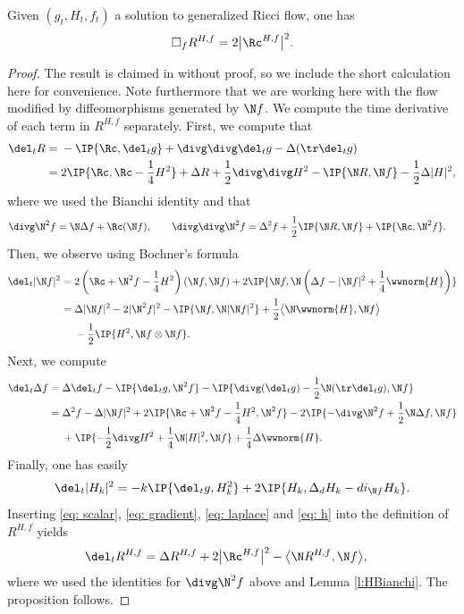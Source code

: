\begin{prop}\label{p:scalarmonotonicity} Given $(g_t, H_t, f_t)$ a solution to generalized Ricci flow, one has
\begin{align*}
\square_f R^{H,f} = 2 \big|\Rc^{H,f}\big|^2.
\end{align*}
\begin{proof} The result is claimed in \cite{Streetsscalar} without proof, so we include the short calculation here for convenience. Note furthermore that we are working here with the flow modified by diffeomorphisms generated by $\N f$. We compute the time derivative of each term in $R^{H,f}$ separately.
First, we compute that
	\begin{align}
 	\del_t R={}&-\IP{\Rc,\del_tg}+\divg\divg\del_t g-\Delta(\tr \del_t g)\nonumber\\
 ={}& 2\IP{\Rc,\Rc-\frac14 H^2}+\Delta R+\frac12\divg\divg H^2-\IP{\N R,\N f}-\frac12\Delta|H|^2, \label{eq: scalar}
 \end{align}
 	where we used the Bianchi identity and that
 	\begin{align*}
 	&\divg \N^2f= \N\Delta f+\Rc(\N f),\qquad\divg\divg \N^2f= \Delta^2 f+\frac12\IP{\N R,\N f}+\IP{\Rc,\N^2 f}.
 	\end{align*}
 	Then, we observe using Bochner's formula
 	\begin{align}
 	\del_t|\N f|^2={}& 2\left(\Rc+\N^2 f-\frac14 H^2\right)(\N f,\N f)+2\IP{\N f,\N\left( \Delta f-|\N f|^2 + \frac{1}{4} \wwnorm{H} \right)}\nonumber\\
 ={}& \Delta|\N f|^2-2|\N^2f|^2-\IP{\N f,\N |\N f|^2}+\frac12\big\langle\N\wwnorm{H},\N f\big\rangle\nonumber\\
 &-\frac12\IP{H^2,\N f\otimes \N f}.\label{eq: gradient}
 \end{align}
 Next, we compute 	
 	\begin{align}
 	\del_t \Delta f={}&\Delta \del_t f-\IP{\del_t g,\N^2 f}-\IP{\divg(\del_tg)-\frac12\N(\tr\del_tg),\N f}\nonumber\\
 ={}&\Delta^2 f-\Delta|\N f|^2+2\IP{\Rc+\N^2 f-\frac14 H^2,\N^2 f}-2\IP{-\divg\N^2f+\frac12\N\Delta f,\N f}\nonumber\\
 	& +\IP{-\frac12\divg H^2+\frac14\N |H|^2,\N f}+\frac14\Delta \wwnorm{H}.\label{eq: laplace}
 \end{align}
 	Finally, one has easily
 	\begin{align} \label{eq: h}
 	\del_t |H_k|^2=-k\IP{\del_t g, H_k^2}+2\IP{H_k,\Delta_d H_k-di_{\N f} H_k}.
 	\end{align}
 	Inserting \eqref{eq: scalar}, \eqref{eq: gradient}, \eqref{eq: laplace} and \eqref{eq: h} into the definition of $R^{H,f}$ yields
 \begin{align*}
 	\del_tR^{H,f}
 	={}&\Delta R^{H,f}+2\big|\Rc^{H,f}\big|^2-\big\langle\N R^{H,f},\N f\big\rangle,
 	\end{align*}
 where we used the identities for $\divg \N^2 f$ above and Lemma \ref{l:HBianchi}. The proposition follows.
\end{proof}
\end{prop}

